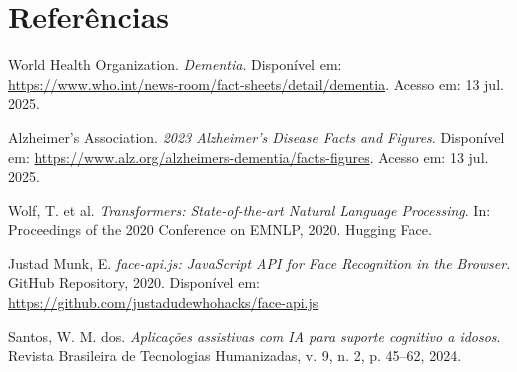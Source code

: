 
\section*{Referências}

\begin{thebibliography}{9}

World Health Organization. 
\textit{Dementia}. 
Disponível em: \url{https://www.who.int/news-room/fact-sheets/detail/dementia}. Acesso em: 13 jul. 2025.

Alzheimer's Association.
\textit{2023 Alzheimer's Disease Facts and Figures}.
Disponível em: \url{https://www.alz.org/alzheimers-dementia/facts-figures}. Acesso em: 13 jul. 2025.

Wolf, T. et al.
\textit{Transformers: State-of-the-art Natural Language Processing}.
In: Proceedings of the 2020 Conference on EMNLP, 2020. Hugging Face.

Justad Munk, E.
\textit{face-api.js: JavaScript API for Face Recognition in the Browser}.
GitHub Repository, 2020. Disponível em: \url{https://github.com/justadudewhohacks/face-api.js}

Santos, W. M. dos.
\textit{Aplicações assistivas com IA para suporte cognitivo a idosos}. 
Revista Brasileira de Tecnologias Humanizadas, v. 9, n. 2, p. 45–62, 2024.

\end{thebibliography}
